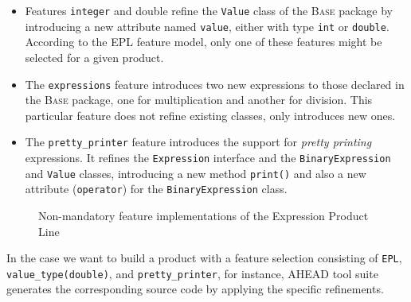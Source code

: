 \begin{itemize}
\item Features \texttt{integer} and {double} refine the \texttt{Value} class of 
the \textsc{Base} package by introducing a new attribute named 
\texttt{value}, either with type \texttt{int} or \texttt{double}. According 
to the EPL feature model, only one of these features might be selected for 
a given product. 

\item The \texttt{expressions} feature introduces two new expressions 
to those declared in the \textsc{Base} package, one for multiplication 
and another for division. This particular feature does not refine 
existing classes, only introduces new ones. 

\item The \texttt{pretty\_printer} feature introduces the support for 
\emph{pretty printing} expressions. It refines the \texttt{Expression} 
interface and the \texttt{BinaryExpression} and \texttt{Value} classes, 
introducing a new method \texttt{print()} and also a 
new attribute (\texttt{operator}) for the \texttt{BinaryExpression} class.

\end{itemize}


\begin{figure}[htb]
\caption{Non-mandatory feature implementations of the Expression Product Line}
\label{fig:epl-features}
\end{figure} 

In the case we want to build a product with  
a feature selection consisting of 
\texttt{EPL}, \texttt{value\_type(double)}, 
and \texttt{pretty\_printer}, for instance, AHEAD tool suite 
generates the corresponding source code 
by applying the specific refinements. 



